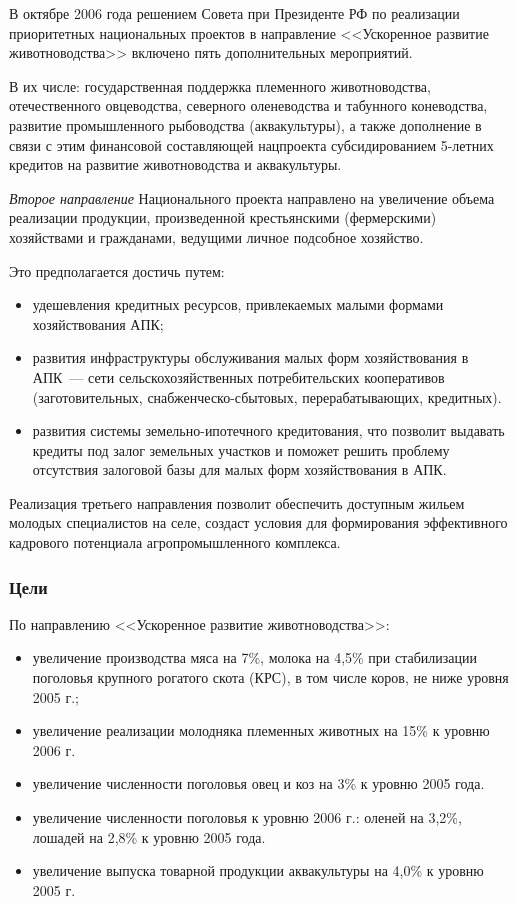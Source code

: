 \documentclass[article, 12pt, russian, oneside]{ncc}
\begin{document}
В октябре 2006 года решением Совета при Президенте РФ по реализации приоритетных национальных проектов в направление <<Ускоренное развитие животноводства>> включено пять дополнительных мероприятий.

В их числе: государственная поддержка племенного животноводства, отечественного овцеводства, северного оленеводства и табунного коневодства, развитие промышленного рыбоводства (аквакультуры), а также дополнение в связи с этим финансовой составляющей нацпроекта субсидированием 5-летних кредитов на развитие животноводства и аквакультуры.

\emph{Второе направление} Национального проекта направлено на увеличение объема реализации продукции, произведенной крестьянскими (фермерскими) хозяйствами и гражданами, ведущими личное подсобное хозяйство.

Это предполагается достичь путем:

\begin{itemize}
\item удешевления кредитных ресурсов, привлекаемых малыми формами хозяйствования АПК;
\item развития инфраструктуры обслуживания малых форм хозяйствования в АПК~--- сети сельскохозяйственных потребительских кооперативов (заготовительных, снабженческо-сбытовых, перерабатывающих, кредитных).
\item развития системы земельно-ипотечного кредитования, что позволит выдавать кредиты под залог земельных участков и поможет решить проблему отсутствия залоговой базы для малых форм хозяйствования в АПК.
\end{itemize}

Реализация третьего направления позволит обеспечить доступным жильем молодых специалистов на селе, создаст условия для формирования эффективного кадрового потенциала агропромышленного комплекса.

\subsubsection{Цели}

По направлению <<Ускоренное развитие животноводства>>:

\begin{itemize}
\item увеличение производства мяса на 7\%, молока на 4,5\% при стабилизации поголовья крупного рогатого скота (КРС), в том числе коров, не ниже уровня 2005 г.;
\item увеличение реализации молодняка племенных животных на 15\% к уровню 2006 г.
\item увеличение численности поголовья овец и коз на 3\% к уровню 2005 года.
\item увеличение численности поголовья к уровню 2006 г.: оленей на 3,2\%, лошадей на 2,8\% к уровню 2005 года.
\item увеличение выпуска товарной продукции аквакультуры на 4,0\% к уровню 2005 г.
\end{itemize}
\end{document}
